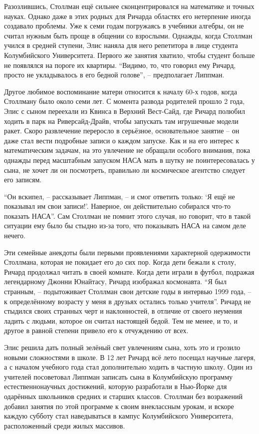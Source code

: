 Разозлившись, Столлман ещё сильнее сконцентрировался на математике и точных науках. Однако даже в этих родных для Ричарда областях его нетерпение иногда создавало проблемы. Уже к семи годам погружаясь в учебники алгебры, он не считал нужным быть проще в общении со взрослыми. Однажды, когда Столлман учился в средней ступени, Элис наняла для него репетитора в лице студента Колумбийского Университета. Первого же занятия хватило, чтобы студент больше не появлялся на пороге их квартиры. \enquote{Видимо, то, что говорил ему Ричард, просто не укладывалось в его бедной голове}, -- предполагает Липпман.

Другое любимое воспоминание матери относится к началу 60-х годов, когда Столлману было около семи лет. С момента развода родителей прошло 2 года, Элис с сыном переехали из Квинса в Верхний Вест-Сайд, где Ричард полюбил ходить в парк на Риверсайд-Драйв, чтобы запускать там игрушечные модели ракет. Скоро развлечение переросло в серьёзное, основательное занятие -- он даже стал вести подробные записи о каждом запуске. Как и на его интерес к математическим задачам, на это увлечение не обращали особого внимания, пока однажды перед масштабным запуском НАСА мать в шутку не поинтересовалась у сына, не хочет ли он посмотреть, правильно ли космическое агентство следует его записям.

\enquote{Он вскипел, -- рассказывает Липпман, -- и смог ответить только: \enquote{Я ещё не показывал им свои записи!}. Наверное, он действительно собирался что-то показать НАСА}. Сам Столлман не помнит этого случая, но говорит, что в такой ситуации ему было бы стыдно из-за того, что показывать НАСА на самом деле нечего.

Эти семейные анекдоты были первыми проявлениями характерной одержимости Столлмана, которая не покидает его до сих пор. Когда дети бежали к столу, Ричард продолжал читать в своей комнате. Когда дети играли в футбол, подражая легендарному Джонни Юнайтасу, Ричард изображал космонавта. \enquote{Я был странным, -- подытоживает Столлман свои детские годы в интервью 1999 года, -- к определённому возрасту у меня в друзьях остались только учителя}. Ричард не стыдился своих странных черт и наклонностей, в отличие от своего неумения ладить с людьми, которое он считал настоящей бедой. Тем не менее, и то, и другое в равной степени привело его к отчуждению от всех.

Элис решила дать полный зелёный свет увлечениям сына, хоть это и грозило новыми сложностями в школе. В 12 лет Ричард всё лето посещал научные лагеря, а с началом учебного года стал дополнительно ходить в частную школу. Один из учителей посоветовал Липпман записать сына в Колумбийскую программу естественнонаучных достижений, которую разработали в Нью-Йорке для одарённых школьников средних и старших классов. Столлман без возражений добавил занятия по этой программе к своим внеклассным урокам, и вскоре каждую субботу стал наведываться в кампус Колумбийского Университета, расположенный среди жилых массивов.

